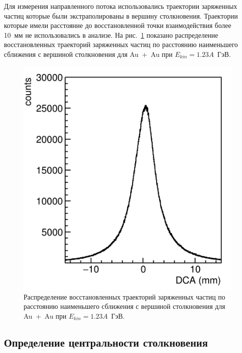 Для измерения направленного потока использовались траектории заряженных частиц которые были экстраполированы в вершину столкновения.
Траектории которые имели расстояние до восстановленной точки взаимодействия более 10~мм не использовались в анализе.
На рис.~\ref{fig:hades_dca} показано распределение восстановленных траекторий заряженных частиц по расстоянию наименьшего сближения с вершиной столкновения для Au~+~Au при $E_{kin}=1.23A$~ГэВ.
\begin{figure}[ht]
    \begin{center}
        \includegraphics[width=0.55\linewidth]{images/hades_dca.png}
        \caption{Распределение восстановленных траекторий заряженных частиц по расстоянию наименьшего сближения с вершиной столкновения для Au~+~Au при $E_{kin}=1.23A$~ГэВ.}
        \label{fig:hades_dca}
    \end{center}
\end{figure}

\subsection{Определение центральности столкновения}

